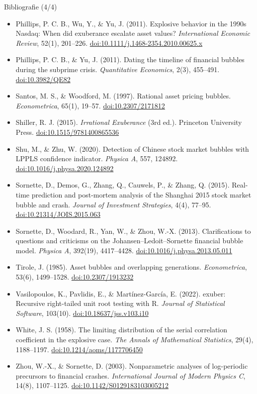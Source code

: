 \begin{frame}{Bibliografie (4/4)}
\itemsize{\tiny}
\begin{itemize}
    \item Phillips, P. C. B., Wu, Y., \& Yu, J. (2011). Explosive behavior in the 1990s Nasdaq: When did exuberance escalate asset values? \textit{International Economic Review}, 52(1), 201--226. \href{https://doi.org/10.1111/j.1468-2354.2010.00625.x}{doi:10.1111/j.1468-2354.2010.00625.x}
    \item Phillips, P. C. B., \& Yu, J. (2011). Dating the timeline of financial bubbles during the subprime crisis. \textit{Quantitative Economics}, 2(3), 455--491. \href{https://doi.org/10.3982/QE82}{doi:10.3982/QE82}
    \item Santos, M. S., \& Woodford, M. (1997). Rational asset pricing bubbles. \textit{Econometrica}, 65(1), 19--57. \href{https://doi.org/10.2307/2171812}{doi:10.2307/2171812}
    \item Shiller, R. J. (2015). \textit{Irrational Exuberance} (3rd ed.). Princeton University Press. \href{https://doi.org/10.1515/9781400865536}{doi:10.1515/9781400865536}
    \item Shu, M., \& Zhu, W. (2020). Detection of Chinese stock market bubbles with LPPLS confidence indicator. \textit{Physica A}, 557, 124892. \href{https://doi.org/10.1016/j.physa.2020.124892}{doi:10.1016/j.physa.2020.124892}
    \item Sornette, D., Demos, G., Zhang, Q., Cauwels, P., \& Zhang, Q. (2015). Real-time prediction and post-mortem analysis of the Shanghai 2015 stock market bubble and crash. \textit{Journal of Investment Strategies}, 4(4), 77--95. \href{https://doi.org/10.21314/JOIS.2015.063}{doi:10.21314/JOIS.2015.063}
    \item Sornette, D., Woodard, R., Yan, W., \& Zhou, W.-X. (2013). Clarifications to questions and criticisms on the Johansen--Ledoit--Sornette financial bubble model. \textit{Physica A}, 392(19), 4417--4428. \href{https://doi.org/10.1016/j.physa.2013.05.011}{doi:10.1016/j.physa.2013.05.011}
    \item Tirole, J. (1985). Asset bubbles and overlapping generations. \textit{Econometrica}, 53(6), 1499--1528. \href{https://doi.org/10.2307/1913232}{doi:10.2307/1913232}
    \item Vasilopoulos, K., Pavlidis, E., \& Martínez-García, E. (2022). exuber: Recursive right-tailed unit root testing with R. \textit{Journal of Statistical Software}, 103(10). \href{https://doi.org/10.18637/jss.v103.i10}{doi:10.18637/jss.v103.i10}
    \item White, J. S. (1958). The limiting distribution of the serial correlation coefficient in the explosive case. \textit{The Annals of Mathematical Statistics}, 29(4), 1188--1197. \href{https://doi.org/10.1214/aoms/1177706450}{doi:10.1214/aoms/1177706450}
    \item Zhou, W.-X., \& Sornette, D. (2003). Nonparametric analyses of log-periodic precursors to financial crashes. \textit{International Journal of Modern Physics C}, 14(8), 1107--1125. \href{https://doi.org/10.1142/S0129183103005212}{doi:10.1142/S0129183103005212}
\end{itemize}
\end{frame}



